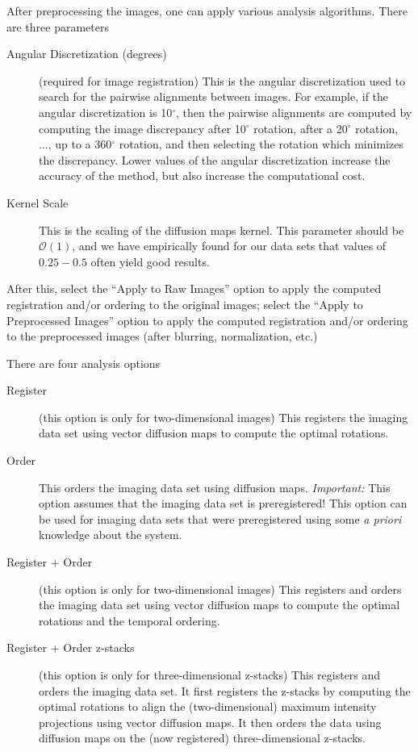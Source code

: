 \documentclass[12pt]{article}
\begin{document}
After preprocessing the images, one can apply various analysis algorithms. 
%
There are three parameters
%
\begin{description}
%
\item[Angular Discretization (degrees)] (required for image registration) This is the angular discretization used to search for the pairwise alignments between images. For example, if the angular discretization is 10$^\circ$, then the pairwise alignments are computed by computing the image discrepancy after 10$^\circ$ rotation, after a 20$^\circ$ rotation, ..., up to a 360$^\circ$ rotation, and then selecting the rotation which minimizes the discrepancy. Lower values of the angular discretization increase the accuracy of the method, but also increase the computational cost. 
%
\item[Kernel Scale] This is the scaling of the diffusion maps kernel. This parameter should be $\mathcal{O}(1)$, and we have empirically found for our data sets that values of $0.25-0.5$ often yield good results. 
%
\end{description}

After this, select the ``Apply to Raw Images'' option to apply the computed registration and/or ordering to the original images; select the ``Apply to Preprocessed Images'' option to apply the computed registration and/or ordering to the preprocessed images (after blurring, normalization, etc.)

There are four analysis options
\begin{description}
%
\item[Register] (this option is only for two-dimensional images) This registers the imaging data set using vector diffusion maps to compute the optimal rotations. 
%
\item[Order] This orders the imaging data set using diffusion maps. {\em Important:} This option assumes that the imaging data set is preregistered! This option can be used for imaging data sets that were preregistered using some {\em a priori} knowledge about the system. 
%
\item[Register + Order] (this option is only for two-dimensional images) This registers and orders the imaging data set using vector diffusion maps to compute the optimal rotations and the temporal ordering. 
%
\item[Register + Order z-stacks] (this option is only for three-dimensional z-stacks) This registers and orders the imaging data set. It first registers the z-stacks by computing the optimal rotations to align the (two-dimensional) maximum intensity projections using vector diffusion maps.  It then orders the data using diffusion maps on the (now registered) three-dimensional z-stacks. 
%
\end{description}
\end{document}
